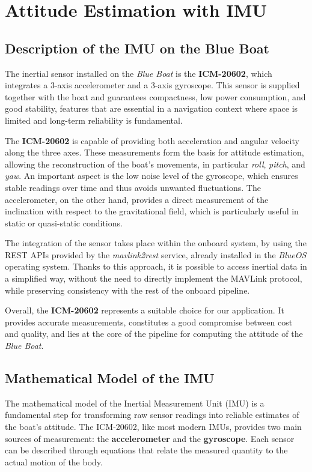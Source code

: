 \chapter{Attitude Estimation with IMU}
\thispagestyle{empty}
\section{Description of the IMU on the Blue Boat}
The inertial sensor installed on the \textit{Blue Boat} is the \textbf{ICM-20602}, which integrates a 3-axis accelerometer and a 3-axis gyroscope. This sensor is supplied together with the boat and guarantees compactness, low power consumption, and good stability, features that are essential in a navigation context where space is limited and long-term reliability is fundamental.  

The \textbf{ICM-20602} is capable of providing both acceleration and angular velocity along the three axes. These measurements form the basis for attitude estimation, allowing the reconstruction of the boat’s movements, in particular \textit{roll}, \textit{pitch}, and \textit{yaw}. An important aspect is the low noise level of the gyroscope, which ensures stable readings over time and thus avoids unwanted fluctuations. The accelerometer, on the other hand, provides a direct measurement of the inclination with respect to the gravitational field, which is particularly useful in static or quasi-static conditions.  

The integration of the sensor takes place within the onboard system, by using the REST APIs provided by the \textit{mavlink2rest} service, already installed in the \textit{BlueOS} operating system. Thanks to this approach, it is possible to access inertial data in a simplified way, without the need to directly implement the MAVLink protocol, while preserving consistency with the rest of the onboard pipeline.  

Overall, the \textbf{ICM-20602} represents a suitable choice for our application. It provides accurate measurements, constitutes a good compromise between cost and quality, and lies at the core of the pipeline for computing the attitude of the \textit{Blue Boat}.  

\section{Mathematical Model of the IMU}

The mathematical model of the Inertial Measurement Unit (IMU) is a fundamental step for transforming raw sensor readings into reliable estimates of the boat’s attitude. The ICM-20602, like most modern IMUs, provides two main sources of measurement: the \textbf{accelerometer} and the \textbf{gyroscope}. Each sensor can be described through equations that relate the measured quantity to the actual motion of the body.

